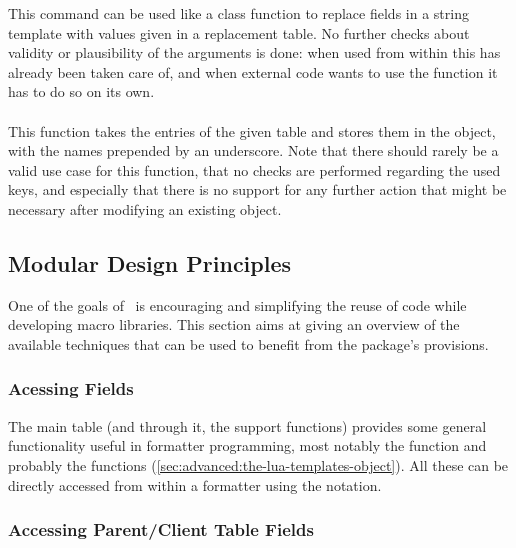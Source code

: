 \documentclass[12pt]{scrartcl}
\begin{document}
This command can be used like a class function to replace fields in a string
template with values given in a replacement table.  No further checks about
validity or plausibility of the arguments is done: when used from within
 this has already been taken care of, and
when external code wants to use the function it has to do so on its own.


\paragraph{}
\label{sec:advanced:formatter:update}

This function takes the entries of the given table and stores them in the
 object, with the names prepended by an underscore. Note that
there should rarely be a valid use case for this function, that no checks are
performed regarding the used keys, and especially that there is no support for
any further action that might be necessary after modifying an existing
 object.


\subsection{Modular Design Principles}
\label{sec:advanced:modular-design-principles}

One of the goals of \luaformatters\ is encouraging and simplifying the reuse of
code while developing macro libraries.  This section aims at giving an overview
of the available techniques that can be used to benefit from the package's
provisions.


\subsubsection{Acessing  Fields}
\label{sec:advanced:modular:lua-templates-fields}

The main table  (and through it, the support functions)
provides some general functionality useful in formatter programming, most
notably the  function and probably the 
functions (\vref{sec:advanced:the-lua-templates-object}).  All these can be
directly accessed from within a formatter using the  notation.


\subsubsection{Accessing Parent/Client Table Fields}
\label{sec:advanced:modular:parent-table}
\end{document}
